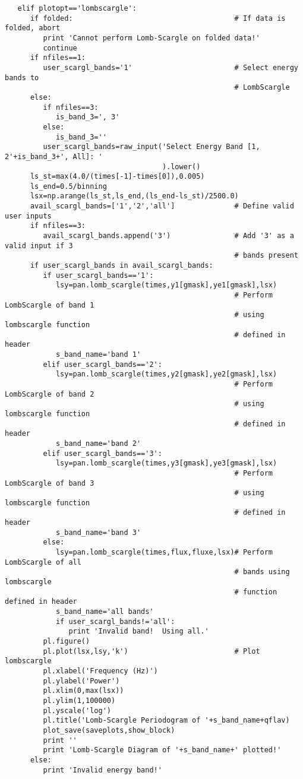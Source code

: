 \begin{verbatim}
   elif plotopt=='lombscargle':
      if folded:                                      # If data is folded, abort
         print 'Cannot perform Lomb-Scargle on folded data!'
         continue
      if nfiles==1:
         user_scargl_bands='1'                        # Select energy bands to
                                                      # LombScargle
      else:
         if nfiles==3:
            is_band_3=', 3'
         else:
            is_band_3=''
         user_scargl_bands=raw_input('Select Energy Band [1, 2'+is_band_3+', All]: '
                                     ).lower()
      ls_st=max(4.0/(times[-1]-times[0]),0.005)
      ls_end=0.5/binning
      lsx=np.arange(ls_st,ls_end,(ls_end-ls_st)/2500.0)
      avail_scargl_bands=['1','2','all']              # Define valid user inputs
      if nfiles==3:
         avail_scargl_bands.append('3')               # Add '3' as a valid input if 3
                                                      # bands present
      if user_scargl_bands in avail_scargl_bands:
         if user_scargl_bands=='1':
            lsy=pan.lomb_scargle(times,y1[gmask],ye1[gmask],lsx)
                                                      # Perform LombScargle of band 1
                                                      # using lombscargle function
                                                      # defined in header
            s_band_name='band 1'
         elif user_scargl_bands=='2':
            lsy=pan.lomb_scargle(times,y2[gmask],ye2[gmask],lsx)
                                                      # Perform LombScargle of band 2
                                                      # using lombscargle function
                                                      # defined in header
            s_band_name='band 2'
         elif user_scargl_bands=='3':
            lsy=pan.lomb_scargle(times,y3[gmask],ye3[gmask],lsx)
                                                      # Perform LombScargle of band 3
                                                      # using lombscargle function
                                                      # defined in header
            s_band_name='band 3'
         else:
            lsy=pan.lomb_scargle(times,flux,fluxe,lsx)# Perform LombScargle of all
                                                      # bands using lombscargle
                                                      # function defined in header
            s_band_name='all bands'
            if user_scargl_bands!='all':
               print 'Invalid band!  Using all.'
         pl.figure()
         pl.plot(lsx,lsy,'k')                         # Plot lombscargle
         pl.xlabel('Frequency (Hz)')
         pl.ylabel('Power')
         pl.xlim(0,max(lsx))
         pl.ylim(1,100000)
         pl.yscale('log')
         pl.title('Lomb-Scargle Periodogram of '+s_band_name+qflav)
         plot_save(saveplots,show_block)
         print ''
         print 'Lomb-Scargle Diagram of '+s_band_name+' plotted!'
      else:
         print 'Invalid energy band!'


\end{verbatim}
